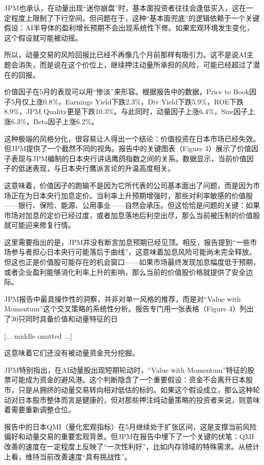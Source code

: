 \documentclass[11pt]{ctexart}
\begin{document}
JPM也承认，在动量出现“迷你崩盘”时，基本面投资者往往会逢低买入，这在一定程度上限制了下行空间。但问题在于，这种“基本面兜底”的逻辑依赖于一个关键假设：AI半导体的盈利增长预期不会出现系统性下修。如果宏观环境发生变化，这个假设就可能被动摇。

所以，动量交易的风险回报比已经不再像几个月前那样有吸引力。这不是说AI主题会消失，而是说在这个价位上，继续押注动量所承担的风险，可能已经超过了潜在的回报。

价值因子在5月的表现可以用“惨淡”来形容。根据报告中的数据，Price to Book因子5月仅上涨0.8\%，Earnings Yield下跌2.3\%，Div Yield下跌5.9\%，ROE下跌8.9\%，JPM Quality更是下跌10.3\%。与此同时，动量因子上涨6.4\%，Size因子上涨6.3\%，Beta因子上涨6.2\%。

这种极端的风格分化，很容易让人得出一个结论：价值投资在日本市场已经失效。但JPM提供了一个截然不同的视角。报告中的关键图表（Figure 3）展示了价值因子表现与JPM编制的日本央行讲话鹰鸽指数之间的关系。数据显示，当前价值因子的低迷表现，与日本央行鹰派言论的升温高度相关。

这意味着，价值因子的跑输不是因为它所代表的公司基本面出了问题，而是因为市场正在为日本央行加息定价。当利率上升预期增强时，那些对利率敏感的价值股——银行、保险、能源、公用事业——自然会承压。但这恰恰是问题的关键：如果市场对加息的定价已经过度，或者加息落地后利空出尽，那么当前被压制的价值股就可能迎来修复行情。

这里需要指出的是，JPM并没有断言加息预期已经见顶。相反，报告提到“一些市场参与者担心日本央行可能落后于曲线”，这意味着加息风险可能尚未完全释放。但这也正是价值股可能存在的机会窗口——如果市场最终发现加息幅度低于预期，或者企业盈利能够消化利率上升的影响，那么当前的价值股价格就提供了安全边际。

JPM报告中最具操作性的洞察，并非对单一风格的推荐，而是对“Value with Momentum”这个交叉策略的系统性分析。报告专门用一张表格（Figure 4）列出了30只同时具备价值和动量特征的日

[... middle omitted ...]

这意味着它们还没有被动量资金充分挖掘。

JPM特别指出，在AI动量股出现短期轮动时，“Value with Momentum”特征的股票可能成为资金的避风港。这个判断隐含了一个重要假设：资金不会离开日本股市，只是从拥挤的动量交易转向相对低估的标的。如果这个假设成立，那么这种轮动对日本股市整体而言是健康的，但对那些押注纯动量策略的投资者来说，则意味着需要重新调整仓位。

报告中的日本QMI（量化宏观指标）在5月继续处于扩张区间，这是支撑当前风险偏好和动量交易的重要宏观背景。但JPM在报告中埋下了一个关键的伏笔：QMI改善的速度在一定程度上反映了“一次性利好”，比如内存领域的特殊需求。从统计上看，维持当前改善速度“具有挑战性”。
\end{document}
